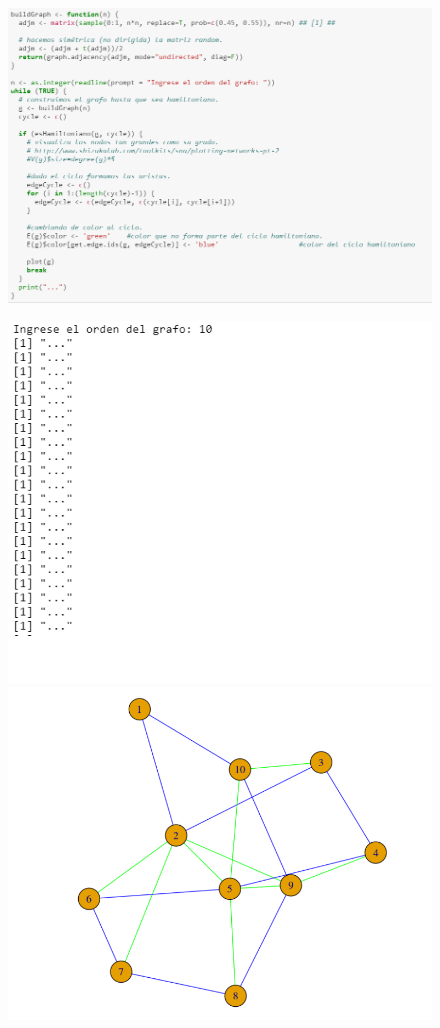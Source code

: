 \documentclass[journal]{IEEEtran}
\begin{document}
\begin{figure}
	\includegraphics[scale=0.5]{parte_3.PNG}
\end{figure}
\newpage



\begin{figure}
	\includegraphics[scale=0.5]{parte_4.PNG}
	\includegraphics[scale=0.5]{parte_5.PNG}
\end{figure}
\end{document}
